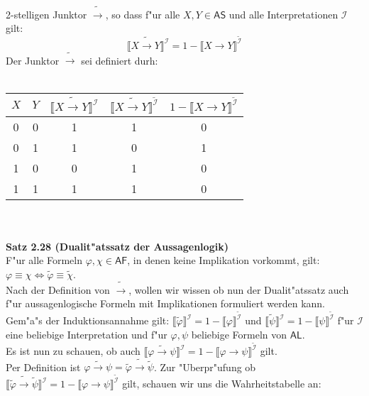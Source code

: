 \documentclass[a4paper,10pt]{article}
\begin{document}
\begin{compactenum} [(a)]
		\item 2-stelligen Junktor $\tilde{\rightarrow}$, so dass f"ur alle $X, Y \in \mathsf{AS}$ und alle Interpretationen $\mathcal{I}$ gilt: \[\llbracket X \tilde{\rightarrow} Y \rrbracket^\mathcal{I} = 1 - \llbracket X \rightarrow Y \rrbracket^{\tilde{\mathcal{I}}} \]
		Der Junktor $\tilde{\rightarrow}$ sei definiert durh:\\\\
		\begin{tabular}{c|c|c|c|c}
			$X$ & $Y$ & $\llbracket X \tilde{\rightarrow} Y \rrbracket^\mathcal{I}$ & $\llbracket X \tilde{\rightarrow} Y \rrbracket^{\tilde{\mathcal{I}}}$ &  $1 - \llbracket X \rightarrow Y \rrbracket^{\tilde{\mathcal{I}}}$\\ 
			\hline 
			0 & 0 & 1 & 1 & 0 \\ 
			\hline 
			0 & 1 & 1 & 0 & 1 \\ 
			\hline 
			1 & 0 & 0 & 1 & 0 \\ 
			\hline 
			1 & 1 & 1 & 1 & 0 \\ 
		\end{tabular} \ \\\\
		\textbf{Satz 2.28 (Dualit"atssatz der Aussagenlogik)}\\
		F"ur alle Formeln $\varphi, \chi \in \mathsf{AF}$, in denen keine Implikation vorkommt, gilt: $\varphi \equiv \chi \Leftrightarrow \tilde{\varphi} \equiv \tilde{\chi}$.\\
		Nach der Definition von $\tilde{\rightarrow}$, wollen wir wissen ob nun der Dualit"atssatz auch f"ur aussagenlogische Formeln mit Implikationen formuliert werden kann. \\
		Gem"a"s der Induktionsannahme gilt: $\llbracket \tilde{\varphi} \rrbracket^\mathcal{I} = 1 - \llbracket \varphi \rrbracket^{\tilde{\mathcal{I}}}$ und $\llbracket \tilde{\psi} \rrbracket^\mathcal{I} = 1 - \llbracket \psi \rrbracket^{\tilde{\mathcal{I}}}$ f"ur $\mathcal{I}$ eine beliebige Interpretation und f"ur $\varphi, \psi$ beliebige Formeln von $\mathsf{AL}$.\\
		Es ist nun zu schauen, ob auch $\llbracket \widetilde{\varphi \rightarrow \psi} \rrbracket^\mathcal{I} = 1 - \llbracket \varphi \rightarrow \psi \rrbracket^{\tilde{\mathcal{I}}}$ gilt.\\
		Per Definition ist $\widetilde{\varphi \rightarrow \psi} = \tilde{\varphi} \tilde{\rightarrow} \tilde{\psi}$. Zur "Uberpr"ufung ob $\llbracket \tilde{\varphi} \tilde{\rightarrow} \tilde{\psi} \rrbracket^{\mathcal{I}} = 1 - \llbracket \varphi \rightarrow \psi \rrbracket^{\tilde{\mathcal{I}}}$ gilt, schauen wir uns die Wahrheitstabelle an:\\\\

\end{compactenum}
\end{document}

